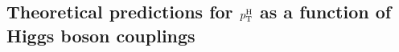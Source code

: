 \subsection{Theoretical predictions for \texorpdfstring{$p_\mathrm{T}^\mathrm{H}$}{pTH} as a function of Higgs boson couplings}



